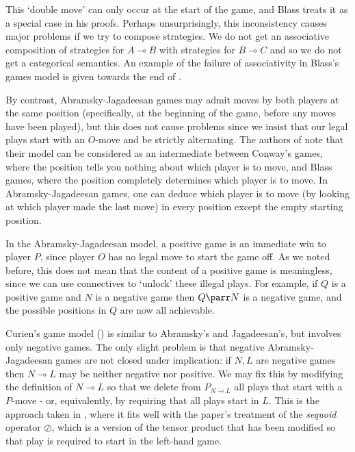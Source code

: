 \documentclass[11pt]{article} %
\theoremstyle{plain} %
\theoremstyle{definition} %
\theoremstyle{note}
\theoremstyle{exercisestyle}
\newcommand{\sequoid}{\oslash}
\renewcommand{\implies}{\multimap}
\begin{document}
This `double move' can only occur at the start of the game, and Blass treats it as a special case in his proofs.  Perhaps unsurprisingly, this inconsistency causes major problems if we try to compose strategies.  We do not get an associative composition of strategies for $A\implies B$ with strategies for $B\implies C$ and so we do not get a categorical semantics.  An example of the failure of associativity in Blass's games model is given towards the end of \cite{abramskyjagadeesangames}.

By contrast, Abramsky-Jagadeesan games may admit moves by both players at the same position (specifically, at the beginning of the game, before any moves have been played), but this does not cause problems since we insist that our legal plays start with an $O$-move and be strictly alternating.  The authors of \cite{abramskyjagadeesangames} note that their model can be considered as an intermediate between Conway's games, where the position tells you nothing about which player is to move, and Blass games, where the position completely determines which player is to move.  In Abramsky-Jagadeesan games, one can deduce which player is to move (by looking at which player made the last move) in every position except the empty starting position.

In the Abramsky-Jagadeesan model, a positive game is an immediate win to player $P$, since player $O$ has no legal move to start the game off.  As we noted before, this does not mean that the content of a positive game is meaningless, since we can use connectives to `unlock' these illegal plays.  For example, if $Q$ is a positive game and $N$ is a negative game then $Q\parr N$ is a negative game, and the possible positions in $Q$ are now all achievable.  

Curien's game model (\cite{curiengames}) is similar to Abramsky's and Jagadeesan's, but involves only negative games.  The only slight problem is that negative Abramsky-Jagadeesan games are not closed under implication: if $N,L$ are negative games then $N\implies L$ may be neither negative nor positive.  We may fix this by modifying the definition of $N\implies L$ so that we delete from $P_{N\implies L}$ all plays that start with a $P$-move - or, equivalently, by requiring that all plays start in $L$.  This is the approach taken in \cite{martinsthesis}, where it fits well with the paper's treatment of the \emph{sequoid} operator $\sequoid$, which is a version of the tensor product that has been modified so that play is required to start in the left-hand game.
\end{document}
